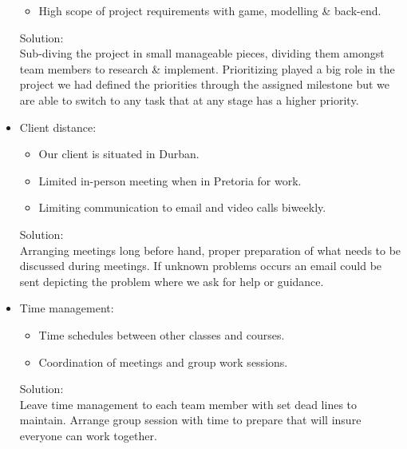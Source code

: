 \documentclass[letterpaper]{article}
\begin{document}
\begin{itemize}
\begin{itemize}
					\item High scope of project requirements with game, modelling \& back-end.
				\end{itemize}
				Solution: \\
				Sub-diving the project in small manageable pieces, dividing them amongst team members to research \& implement. Prioritizing played a big role in the project we had defined the priorities through the assigned milestone but we are able to switch to any task that at any stage has a higher priority.
			\item Client distance:
				\begin{itemize}
					\item Our client is situated in Durban.
					\item Limited in-person meeting when in Pretoria for work.
					\item Limiting communication to email and video calls biweekly.
				\end{itemize}
				Solution: \\
				Arranging meetings long before hand, proper preparation of what needs to be discussed during meetings. If unknown problems occurs an email could be sent depicting the problem where we ask for help or guidance.
			\item Time management:
				\begin{itemize}
					\item Time schedules between other classes and courses.
					\item Coordination of meetings and group work sessions.
				\end{itemize}
				Solution: \\
				Leave time management to each team member with set dead lines to maintain. Arrange group session with time to prepare that will insure everyone can work together.
		\end{itemize}
		
\end{document}
